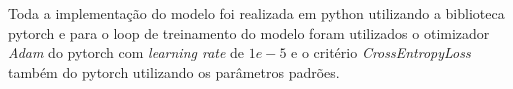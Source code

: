 Toda a implementação do modelo foi realizada em python utilizando a biblioteca pytorch e para o loop de treinamento do modelo foram utilizados o otimizador \textit{Adam} do pytorch com \textit{learning rate} de $1e-5$ e o critério \textit{CrossEntropyLoss} também do pytorch utilizando os parâmetros padrões.



